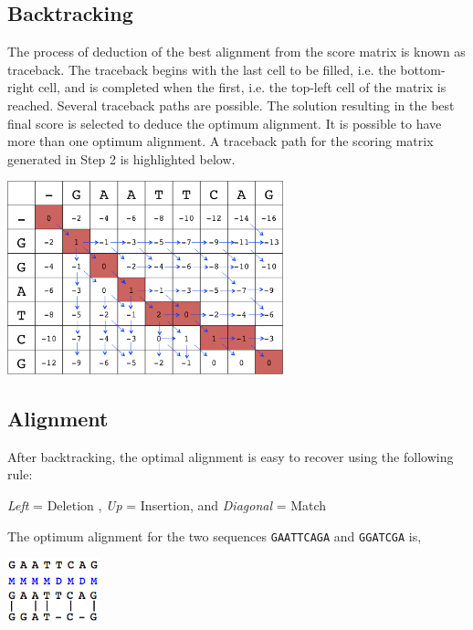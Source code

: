 \documentclass[english, a4paper,11pt]{article}
\begin{document}
\subsection{Backtracking}
The process of deduction of the best alignment from the score matrix is known as traceback. 
The traceback begins with the last cell to be filled, i.e. the bottom-right cell, and is 
completed when the first, i.e. the top-left cell of the matrix is reached. Several 
traceback paths are possible. The solution resulting in the best final score is selected 
to deduce the optimum alignment. It is possible to have more than one optimum alignment. 
A traceback path for the scoring matrix generated in Step 2 is highlighted below.

\begin{center}
\includegraphics[width=0.6\textwidth]{backtracking.png}
\end{center}

\subsection{Alignment}

After backtracking, the optimal alignment is easy to recover using the following rule:

 \emph{Left} = Deletion , \emph{Up} = Insertion, and \emph{Diagonal} = Match 

The optimum alignment for the two sequences \texttt{GAATTCAGA} and \texttt{GGATCGA} is,

\begin{center}
\includegraphics[width=0.2\textwidth]{alignment.png}
\end{center}
\end{document}
